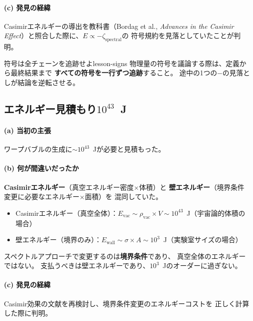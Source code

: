 \paragraph{(c) 発見の経緯}
Casimirエネルギーの導出を教科書（Bordag et al., \emph{Advances in the
Casimir Effect}）と照合した際に、$E \propto -\zeta_{\text{spectral}}$の
符号規約を見落としていたことが判明。

\begin{keylesson}{符号は全チェーンを追跡せよ}{lesson-signs}
物理量の符号を議論する際は、定義から最終結果まで
\textbf{すべての符号を一行ずつ追跡}すること。
途中の1つの$-$の見落としが結論を逆転させる。
\end{keylesson}


\subsection{エネルギー見積もり$10^{43}$~J}
\label{sec:15.8}

\paragraph{(a) 当初の主張}
ワープバブルの生成に$\sim 10^{43}$~Jが必要と見積もった。

\paragraph{(b) 何が間違いだったか}
\textbf{Casimirエネルギー}（真空エネルギー密度$\times$体積）と
\textbf{壁エネルギー}（境界条件変更に必要なエネルギー$\times$面積）を
混同していた。

\begin{itemize}
\item Casimirエネルギー（真空全体）：$E_{\text{vac}} \sim \rho_{\text{vac}} \times V
  \sim 10^{43}$~J（宇宙論的体積の場合）
\item 壁エネルギー（境界のみ）：$E_{\text{wall}} \sim \sigma \times A
  \sim 10^3$~J（実験室サイズの場合）
\end{itemize}

スペクトルアプローチで変更するのは\textbf{境界条件}であり、
真空全体のエネルギーではない。
支払うべきは壁エネルギーであり、$10^3$~Jのオーダーに過ぎない。

\paragraph{(c) 発見の経緯}
Casimir効果の文献を再検討し、境界条件変更のエネルギーコストを
正しく計算した際に判明。

